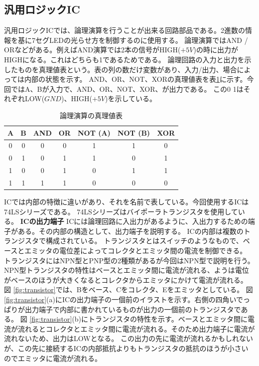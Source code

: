 \documentclass[a4paper,11pt,dvipdfmx]{jsarticle}
\begin{document}
\subsection{汎用ロジックIC}
汎用ロジックICでは、論理演算を行うことが出来る回路部品である。2進数の情報を基に7セグLEDの光らせ方を制御するのに使用する。
論理演算ではAND / ORなどがある。例えばAND演算では2本の信号がHIGH($+5V$)の時に出力がHIGHになる。これはどちらも1であるためである。
論理回路の入力と出力を示したものを真理値表という。表の列の数だけ変数があり、入力/出力、場合によっては内部の状態を示す。
AND、OR、NOT、XORの真理値表を表\ref{tab:logic}に示す。今回ではA、Bが入力で、AND、OR、NOT、XOR、が出力である。
この0 1はそれぞれLOW($GND$)、HIGH($+5V$)を示している。
\begin{table}[h]
  \centering
  \caption{論理演算の真理値表}
  \begin{tabular}{|c|c|c|c|c|c|c|}
    \hline
    A & B & AND & OR & NOT (A) & NOT (B) & XOR \\
    \hline
    0 & 0 & 0 & 0 & 1 & 1 & 0 \\
    0 & 1 & 0 & 1 & 1 & 0 & 1 \\
    1 & 0 & 0 & 1 & 0 & 1 & 1 \\
    1 & 1 & 1 & 1 & 0 & 0 & 0 \\
    \hline
  \end{tabular}
  \label{tab:logic}
\end{table}
ICでは内部の特徴に違いがあり、それを名前で表している。今回使用するICは74LSシリーズである。
74LSシリーズはバイポーラトランジスタを使用している。
\textbf{ICの出力端子}
ICには論理回路に入出力があるように、入出力するための端子がある。その内部の構造として、出力端子を説明する。
ICの内部は複数のトランジスタで構成されている。
トランジスタとはスイッチのようなもので、ベースとエミッタの電位差によってコレクタとエミッタ間の電流を制御できる。
トランジスタにはNPN型とPNP型の2種類があるが今回はNPN型で説明を行う。
NPN型トランジスタの特性はベースとエミッタ間に電流が流れる、ようは電位がベースのほうが大きくなるとコレクタからエミッタにかけて電流が流れる。
図 \ref{fig:transistor}では、Bをベース、Cをコレクタ、Eをエミッタとしている。
図 \ref{fig:transistor}(a)にICの出力端子の一個前のイラストを示す。右側の四角いでっぱりが出力端子で内部に書かれているものが出力の一個前のトランジスタである。
図 \ref{fig:transistor}(b)にトランジスタの特性を示す。ベースとエミッタ間に電流が流れるとコレクタとエミッタ間に電流が流れる。そのため出力端子に電流が流れないため、出力はLOWとなる。
この出力の先に電流が流れるかもしれないが、この先に接続するICの内部抵抗よりもトランジスタの抵抗のほうが小さいのでエミッタに電流が流れる。
\end{document}
